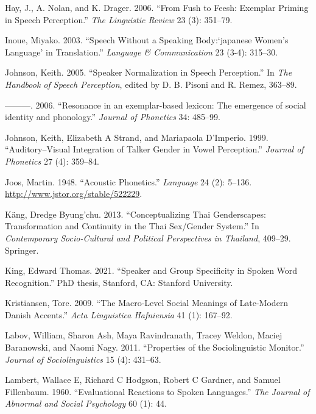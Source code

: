 \documentclass[
  letterpaper,
  DIV=11,
  numbers=noendperiod]{scrartcl}
\newlength{\cslhangindent}
\newenvironment{CSLReferences}[2] %
 {\begin{list}{}{%
  \setlength{\itemindent}{0pt}
  \setlength{\leftmargin}{0pt}
  \setlength{\parsep}{0pt}
  \ifodd #1
   \setlength{\leftmargin}{\cslhangindent}
   \setlength{\itemindent}{-1\cslhangindent}
  \fi
  \setlength{\itemsep}{#2\baselineskip}}}
 {\end{list}}
\begin{document}
\begin{CSLReferences}{1}{0}
Hay, J., A. Nolan, and K. Drager. 2006. {``From Fush to Feesh: Exemplar
Priming in Speech Perception.''} \emph{The Linguistic Review} 23 (3):
351--79.

Inoue, Miyako. 2003. {``Speech Without a Speaking Body:{`japanese
Women's Language'} in Translation.''} \emph{Language \& Communication}
23 (3-4): 315--30.

Johnson, Keith. 2005. {``Speaker Normalization in Speech Perception.''}
In \emph{The Handbook of Speech Perception}, edited by D. B. Pisoni and
R. Remez, 363--89.

---------. 2006. {``{Resonance in an exemplar-based lexicon: The
emergence of social identity and phonology.}''} \emph{Journal of
Phonetics} 34: 485--99.

Johnson, Keith, Elizabeth A Strand, and Mariapaola D'Imperio. 1999.
{``Auditory--Visual Integration of Talker Gender in Vowel Perception.''}
\emph{Journal of Phonetics} 27 (4): 359--84.

Joos, Martin. 1948. {``Acoustic Phonetics.''} \emph{Language} 24 (2):
5--136. \url{http://www.jstor.org/stable/522229}.

Käng, Dredge Byung'chu. 2013. {``Conceptualizing Thai Genderscapes:
Transformation and Continuity in the Thai Sex/Gender System.''} In
\emph{Contemporary Socio-Cultural and Political Perspectives in
Thailand}, 409--29. Springer.

King, Edward Thomas. 2021. {``Speaker and Group Specificity in Spoken
Word Recognition.''} PhD thesis, Stanford, CA: Stanford University.

Kristiansen, Tore. 2009. {``The Macro-Level Social Meanings of
Late-Modern Danish Accents.''} \emph{Acta Linguistica Hafniensia} 41
(1): 167--92.

Labov, William, Sharon Ash, Maya Ravindranath, Tracey Weldon, Maciej
Baranowski, and Naomi Nagy. 2011. {``Properties of the Sociolinguistic
Monitor.''} \emph{Journal of Sociolinguistics} 15 (4): 431--63.

Lambert, Wallace E, Richard C Hodgson, Robert C Gardner, and Samuel
Fillenbaum. 1960. {``Evaluational Reactions to Spoken Languages.''}
\emph{The Journal of Abnormal and Social Psychology} 60 (1): 44.


\end{CSLReferences}
\end{document}
